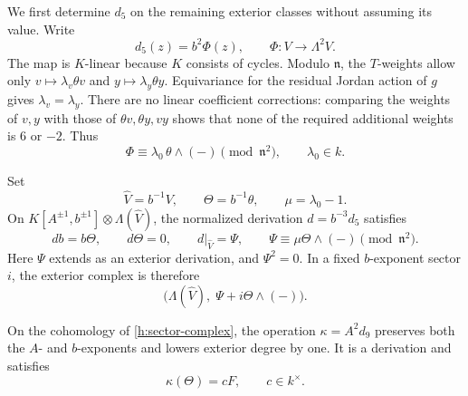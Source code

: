 We first determine $d_5$ on the remaining exterior classes without
assuming its value. Write
\[
 d_5(z)=b^2\Phi(z),\qquad
 \Phi:V\longrightarrow\Lambda^2V.
\]
The map is $K$-linear because $K$ consists of cycles. Modulo
$\mathfrak n$, the $T$-weights allow only
$v\mapsto\lambda_v\theta v$ and
$y\mapsto\lambda_y\theta y$. Equivariance for the residual Jordan
action of $g$ gives $\lambda_v=\lambda_y$. There are no linear
coefficient corrections: comparing the weights of $v,y$ with those of
$\theta v,\theta y,vy$ shows that none of the required additional
weights is $6$ or $-2$. Thus
\begin{equation}
 \label{h:phi-initial}
 \Phi\equiv\lambda_0\,\theta\wedge(-)\pmod{\mathfrak n^2},
 \qquad \lambda_0\in k.
\end{equation}

Set
\[
 \widehat V=b^{-1}V,\qquad \Theta=b^{-1}\theta,
 \qquad \mu=\lambda_0-1.
\]
On $K[A^{\pm1},b^{\pm1}]\otimes\Lambda(\widehat V)$, the normalized
derivation $d=b^{-3}d_5$ satisfies
\begin{equation}
 \label{h:normalized-d5}
 db=b\Theta,\qquad d\Theta=0,\qquad
 d|_{\widehat V}=\Psi,\qquad
 \Psi\equiv\mu\Theta\wedge(-)\pmod{\mathfrak n^2}.
\end{equation}
Here $\Psi$ extends as an exterior derivation, and $\Psi^2=0$.
In a fixed $b$-exponent sector $i$, the exterior complex is therefore
\begin{equation}
 \label{h:sector-complex}
 \bigl(\Lambda(\widehat V),\;\Psi+i\Theta\wedge(-)\bigr).
\end{equation}

\begin{lemma}
 \label{h:normalized-d9}
 On the cohomology of \eqref{h:sector-complex}, the operation
 $\kappa=A^2d_9$ preserves both the $A$- and $b$-exponents and lowers
 exterior degree by one. It is a derivation and satisfies
 \begin{equation}
 \label{h:kappa-theta}
  \kappa(\Theta)=cF,\qquad c\in k^{\times}.
 \end{equation}
\end{lemma}

